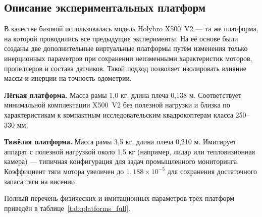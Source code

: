 \subsection{Описание экспериментальных платформ}

В качестве базовой использовалась модель Holybro X500~V2 — та же платформа, на которой проводились все предыдущие эксперименты. На её основе были созданы две дополнительные виртуальные платформы путём изменения только инерционных параметров при сохранении неизменными характеристик моторов, пропеллеров и состава датчиков. Такой подход позволяет изолировать влияние массы и инерции на точность одометрии.

\textbf{Лёгкая платформа.} Масса рамы 1,0 кг, длина плеча 0,138 м. Соответствует минимальной комплектации X500~V2 без полезной нагрузки и близка по характеристикам к компактным исследовательским квадрокоптерам класса 250--330 мм.

\textbf{Тяжёлая платформа.} Масса рамы 3,5 кг, длина плеча 0,210 м. Имитирует аппарат с полезной нагрузкой около 1,5 кг (например, лидар или тепловизионная камера) — типичная конфигурация для задач промышленного мониторинга. Коэффициент тяги мотора увеличен до $1{,}188 \times 10^{-5}$ для сохранения достаточного запаса тяги на висении.

Полный перечень физических и имитационных параметров трёх платформ приведён в таблице~\ref{tab:platforms_full}.

